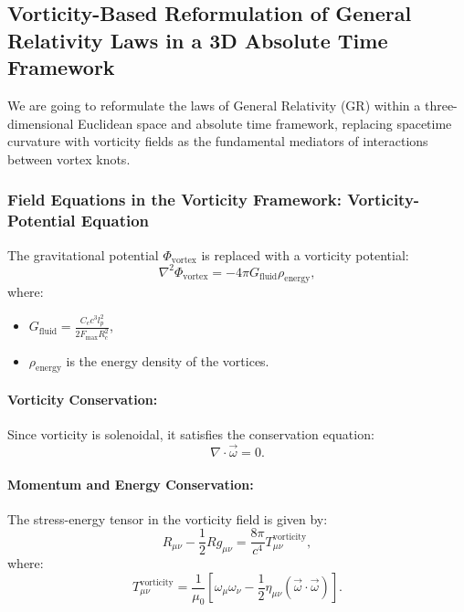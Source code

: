     \subsection{Vorticity-Based Reformulation of General Relativity Laws in a 3D Absolute Time Framework}
    We are going to reformulate the laws of General Relativity (GR) within a three-dimensional Euclidean space and absolute time framework, replacing spacetime curvature with vorticity fields as the fundamental mediators of interactions between vortex knots.

    \subsubsection*{Field Equations in the Vorticity Framework: Vorticity-Potential Equation}
    The gravitational potential $\Phi_{\text{vortex}}$ is replaced with a vorticity potential:
    \begin{equation}
        \nabla^2 \Phi_{\text{vortex}} = -4 \pi G_{\text{fluid}} \rho_{\text{energy}},
    \end{equation}
    where:
    \begin{itemize}
        \item $G_{\text{fluid}} = \frac{C_e c^3 l_p^2}{2 F_{\text{max}} R_c^2}$,
        \item $\rho_{\text{energy}}$ is the energy density of the vortices.
    \end{itemize}

    \paragraph*{Vorticity Conservation:}
    Since vorticity is solenoidal, it satisfies the conservation equation:
    \begin{equation}
        \nabla \cdot \vec{\omega} = 0.
    \end{equation}

    \paragraph*{Momentum and Energy Conservation:}
    The stress-energy tensor in the vorticity field is given by:
    \begin{equation}
        R_{\mu \nu} - \frac{1}{2} R g_{\mu \nu} = \frac{8 \pi}{c^4} T_{\mu \nu}^{\text{vorticity}},
    \end{equation}
    where:
    \begin{equation}
        T_{\mu \nu}^{\text{vorticity}} = \frac{1}{\mu_0} \left[ \omega_\mu \omega_\nu - \frac{1}{2} \eta_{\mu \nu} (\vec{\omega} \cdot \vec{\omega}) \right].
    \end{equation}

